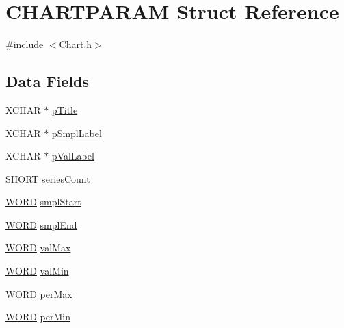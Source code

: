\hypertarget{struct_c_h_a_r_t_p_a_r_a_m}{}\section{C\+H\+A\+R\+T\+P\+A\+R\+A\+M Struct Reference}
\label{struct_c_h_a_r_t_p_a_r_a_m}


{\ttfamily \#include $<$Chart.\+h$>$}

\subsection*{Data Fields}
\begin{DoxyCompactItemize}
\item 
X\+C\+H\+A\+R $\ast$ \hyperlink{struct_c_h_a_r_t_p_a_r_a_m_af8143305fbec3e35759329919aab9bd1}{p\+Title}
\item 
X\+C\+H\+A\+R $\ast$ \hyperlink{struct_c_h_a_r_t_p_a_r_a_m_ab8982745a0ae5efb03ef327e730065cb}{p\+Smpl\+Label}
\item 
X\+C\+H\+A\+R $\ast$ \hyperlink{struct_c_h_a_r_t_p_a_r_a_m_aa56a57d4dc2ff78ebfd08a47a95c73db}{p\+Val\+Label}
\item 
\hyperlink{_generic_type_defs_8h_ae9bb25d3afecf3bfab0fbe3c22c2050f}{S\+H\+O\+R\+T} \hyperlink{struct_c_h_a_r_t_p_a_r_a_m_acf9061e3614ccea341b422de8adf09f8}{series\+Count}
\item 
\hyperlink{_generic_type_defs_8h_a2b0e863dadf920709ec53d9088ee7c91}{W\+O\+R\+D} \hyperlink{struct_c_h_a_r_t_p_a_r_a_m_adaaddb92a714e509d646adeda8eb6527}{smpl\+Start}
\item 
\hyperlink{_generic_type_defs_8h_a2b0e863dadf920709ec53d9088ee7c91}{W\+O\+R\+D} \hyperlink{struct_c_h_a_r_t_p_a_r_a_m_a7013921cfa4c9fb854d02ba800fa8543}{smpl\+End}
\item 
\hyperlink{_generic_type_defs_8h_a2b0e863dadf920709ec53d9088ee7c91}{W\+O\+R\+D} \hyperlink{struct_c_h_a_r_t_p_a_r_a_m_a2b05882760edfbfe7c31d5a9215303c7}{val\+Max}
\item 
\hyperlink{_generic_type_defs_8h_a2b0e863dadf920709ec53d9088ee7c91}{W\+O\+R\+D} \hyperlink{struct_c_h_a_r_t_p_a_r_a_m_a6c99a514ebed840b98db54a3e81373d2}{val\+Min}
\item 
\hyperlink{_generic_type_defs_8h_a2b0e863dadf920709ec53d9088ee7c91}{W\+O\+R\+D} \hyperlink{struct_c_h_a_r_t_p_a_r_a_m_a3fa7dadc05c7046db9b67fb05f41deb3}{per\+Max}
\item 
\hyperlink{_generic_type_defs_8h_a2b0e863dadf920709ec53d9088ee7c91}{W\+O\+R\+D} \hyperlink{struct_c_h_a_r_t_p_a_r_a_m_ab10013cd10a5969380ed65d6e3617054}{per\+Min}

\end{DoxyCompactItemize}
